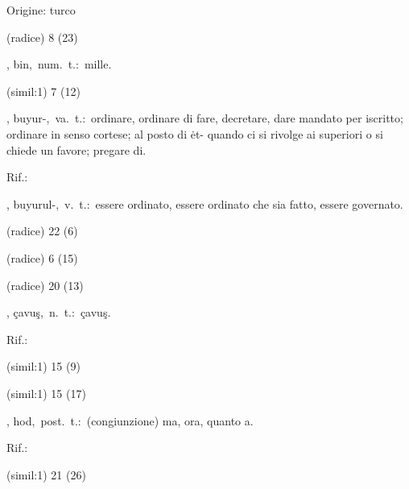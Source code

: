 \begin{glossario}{Origine: turco}
\begin{subvocedue}
\item[(radice)]   8 (23)
\end{subvocedue}
\item[{\color{colorlowref}\spzrl{b.I^n}},] {\sf bin},\ num.\ t.:\ mille.
\begin{subvocedue}
\item[(simil:1)]   7 (12)
\end{subvocedue}
\item[{\color{colorlowref}\spzrl{buy.UrB}},] {\sf buyur-},\ va.\ t.:\ ordinare, ordinare  di fare,  decretare, dare mandato per iscritto; ordinare in senso cortese; al posto di ėt- quando ci si rivolge ai superiori o si chiede un favore; pregare di.
\begin{subvocedue}
\item[Rif.:] 
\end{subvocedue}
\begin{subvocedue}
\item[\subglossariobullet] , {\sf buyurul-},\ v.\ t.:\ essere ordinato, essere  ordinato che  sia fatto, essere governato.
\item[(radice)]   22 (6)
\item[(radice)]   6 (15)
\item[(radice)]   20 (13)
\end{subvocedue}
\item[{\color{colorlowref}\spzrl{^c^A:vu^s}},] {\sf çavuş},\ n.\ t.:\ çavuş.
\begin{subvocedue}
\item[Rif.:] 
\end{subvocedue}
\begin{subvocedue}
\item[(simil:1)]   15 (9)
\item[(simil:1)]   15 (17)
\end{subvocedue}
\item[{\color{colorlowref}\spzrl{_h.Od}},] {\sf hod},\ post.\ t.:\ (congiunzione) ma, ora, quanto a.
\begin{subvocedue}
\item[Rif.:] 
\end{subvocedue}
\begin{subvocedue}
\item[(simil:1)]   21 (26)
\end{subvocedue}



\end{glossario}
